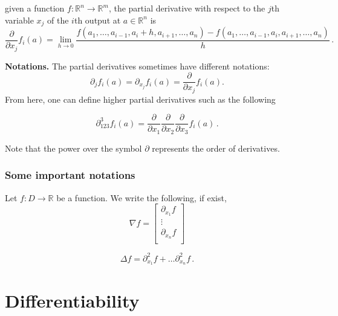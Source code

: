 \documentclass[
]{book}
\theoremstyle{definition}
\theoremstyle{definition}
\theoremstyle{definition}
\theoremstyle{definition}
\theoremstyle{remark}
\begin{document}
given a function \(f:\mathbb{R}^n \to \mathbb{R}^m\), the partial derivative with respect to the \(j\)th variable \(x_j\)
of the \(i\)th output at \(a \in \mathbb{R}^n\) is
\begin{equation*}
    \frac{ \partial }{\partial x_j} f_{i}(a) 
    = \lim_{h\to 0} \frac{ f(a_1, \dots, a_{i-1}, a_i + h , a_{i+1}, \dots, a_n) - f(a_1, \dots, a_{i-1}, a_i  , a_{i+1}, \dots, a_n)}{h} \,.
\end{equation*}

\textbf{Notations.}
The partial derivatives sometimes have different notations:
\begin{equation*}
   \partial_j f_i (a) =  
   \partial_{x_j} f_i (a) =  
    \frac{ \partial }{\partial x_j} f_{i}(a) .
\end{equation*}
From here, one can define higher partial derivatives such as the following

\begin{equation*}
    \partial^3_{1 2 3}  f_i (a) = \frac{\partial}{\partial x_1} \frac{\partial}{\partial x_2} \frac{\partial}{\partial x_3} f_i (a)\,.
\end{equation*}

Note that the power over the symbol \(\partial\) represents the order of derivatives.

\hypertarget{some-important-notations}{%
\subsubsection*{Some important notations}\label{some-important-notations}}


Let \(f:D \to \mathbb{R}\) be a function. We write the following, if exist,
\begin{equation*}
    \nabla f = \begin{bmatrix}
        \partial_{x_1} f\\
        \vdots \\
        \partial_{x_n} f\\
    \end{bmatrix}
\end{equation*}

\begin{equation*}
    \Delta f = \partial_{x_1}^2 f + \dots \partial_{x_n}^2 f \,.
\end{equation*}

\hypertarget{differentiability}{%
\section{Differentiability}\label{differentiability}}
\end{document}
